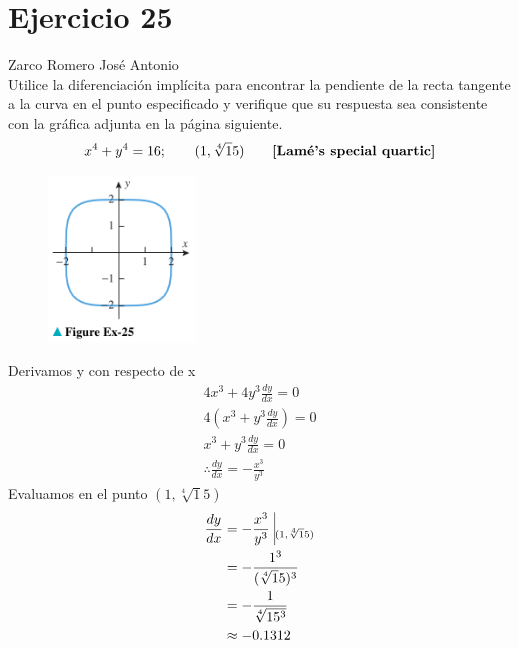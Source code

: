 \documentclass[12pt]{article}
\begin{document}
\section{Ejercicio 25} Zarco Romero José Antonio \\

Utilice la diferenciación implícita para encontrar la pendiente de la recta tangente a la curva en el punto especificado y verifique que su respuesta sea consistente con la gráfica adjunta en la página siguiente.
\begin{equation*}
x^4+y^4=16; \qquad (1, \sqrt[4]15) \qquad \text{\textbf{[Lamé’s special quartic]}}
\end{equation*}
\begin{figure}[H]
\centering
\includegraphics[width=0.35\textwidth]{../img/img_Lista2/3_25.png}
\end{figure}
Derivamos y con respecto de x
\begin{align*}
  4x^3+4y^3\frac{dy}{dx}=0\\
  4(x^3+y^3\frac{dy}{dx})=0\\
  x^3+y^3\frac{dy}{dx}=0\\
  \therefore \frac{dy}{dx}=-\frac{x^3}{y^3}
\end{align*}
Evaluamos en el punto $(1, \sqrt[4]15)$
\begin{equation*}
  \begin{split}
    \frac{dy}{dx}
    &=-\frac{x^3}{y^3} ~ \vline_{(1, \sqrt[4]15)}\\
    &= -\frac{1^3}{(\sqrt[4]15)^3}\\
    &= -\frac{1}{\sqrt[4]{15^3}}\\
    &\approx -0.1312\\
  \end{split}
\end{equation*}

\end{document}
